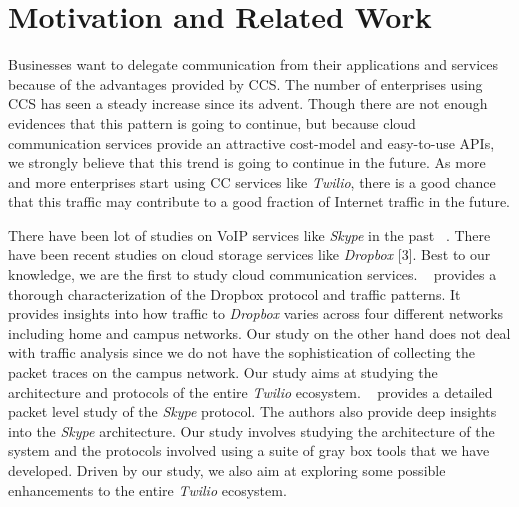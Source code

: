 \section{Motivation and Related Work}
\label{sec-motivationandrelated}
Businesses want to delegate communication from their applications and services because of the advantages provided by CCS. The number of enterprises using CCS has seen a steady increase since its advent. Though there are not enough evidences that this pattern is going to continue, but because cloud communication services provide an attractive cost-model and easy-to-use APIs, we strongly believe that this trend is going to continue in the future. As more and more enterprises start using CC services like \textit{Twilio}, there is a good chance that this traffic may contribute to a good fraction of Internet traffic in the future. \par
There have been lot of studies on VoIP services like \textit{Skype} in the past ~\cite{Baset04ananalysis}. There have been recent studies on cloud storage services like \textit{Dropbox} [3]. Best to our knowledge, we are the first to study cloud communication services. ~\cite{Drago:2012:IDU:2398776.2398827} provides a thorough characterization of the Dropbox protocol and traffic patterns. It provides insights into how traffic to \textit{Dropbox} varies across four different networks including home and campus networks. Our study on the other hand does not deal with traffic analysis since we do not have the sophistication of collecting the packet traces on the campus network. Our study aims at studying the architecture and protocols of the entire \textit{Twilio} ecosystem. ~\cite{Baset04ananalysis} provides a detailed packet level study of the \textit{Skype} protocol. The authors also provide deep insights into the \textit{Skype} architecture. Our study involves studying the architecture of the system and the protocols involved using a suite of gray box tools that we have developed. Driven by our study, we also aim at exploring some possible enhancements to the entire \textit{Twilio} ecosystem.\par